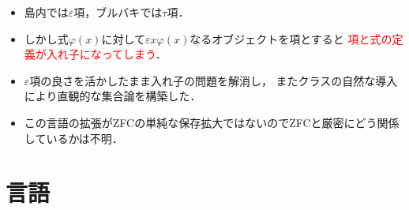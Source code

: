\begin{itemize}
		\item 島内では$\varepsilon$項，ブルバキでは$\tau$項．
			
		\item しかし式$\varphi(x)$に対して$\varepsilon x \varphi(x)$なるオブジェクトを項とすると
			\textcolor{red}{項と式の定義が入れ子になってしまう}．
			
\newpage
		\item $\varepsilon$項の良さを活かしたまま入れ子の問題を解消し，
			またクラスの自然な導入により直観的な集合論を構築した．
		
		\item この言語の拡張がZFCの単純な保存拡大ではないのでZFCと厳密にどう関係しているかは不明．
	\end{itemize}
	
\section{言語}
